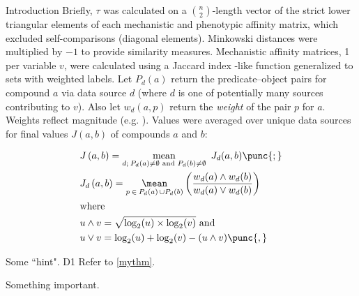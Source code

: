 \begin{MainChapter}{Introduction}
Briefly, $\tau$ was calculated on a $\binom{n}{2}$-length vector of the strict lower triangular elements of each mechanistic and phenotypic affinity matrix, which excluded self-comparisons (diagonal elements).
Minkowski distances were multiplied by $-1$ to provide similarity measures. Mechanistic affinity matrices, 1 per variable $v$, were calculated using a Jaccard index -like function generalized to sets with weighted labels.
Let $P_d(a)$ return the predicate--object pairs for compound $a$ via data source $d$ (where $d$ is one of potentially many sources contributing to $v$). Also let $w_d(a, p)$ return the \emph{weight} of the pair $p$ for $a$. Weights reflect magnitude (e.g. ).
Values were averaged over unique data sources for final values ${J}(a, b)$ of compounds $a$ and $b$:

\begin{align}
    &
    {J} \left( a, b \right) =
    \underset{
        d ; \: P_d(a) \neq \emptyset
        \text{ and } P_d(b) \neq \emptyset
    }{\text{mean}}
    \ \, {J}_d (a, b)  \punc{;} \\
    &
    {J}_d \left(a, b \right) =
    \underset{p \: \in \: P_d(a) \, \cup P_d(b)}{\mean}
    \left(
    \frac{
         w_d(a) \wedge w_d(b)
    }{
        w_d(a) \vee w_d(b)
    }
    \right)\\
    \shortintertext{where}
    &
    u \wedge v = \sqrt{ \log_2(u) \times \log_2(v) } \text{ and}   \\
    &
    u \vee v = \log_2(u) + \log_2(v) - (u \wedge v)
    \punc{,}
\end{align}

\begin{Hint}[name = An optional title., label=myhint]
Some ``hint". \ac{D1}
Refer to \cref{mythm}.
\end{Hint}

\begin{Important}[name=Watch out]
Something important.
\end{Important}



\end{MainChapter}
